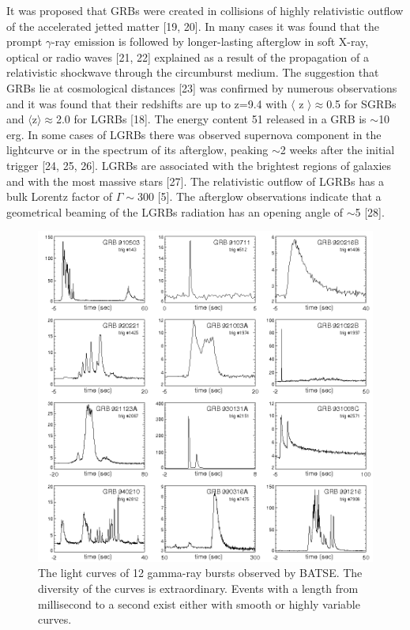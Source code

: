 \documentclass[12pt, a4paper,titlepage]{article}
\numberwithin{equation}{section}
\numberwithin{figure}{section}
\begin{document}
It was proposed that GRBs were created in collisions of highly relativistic outflow of the accelerated jetted matter [19, 20]. In many cases it was found that the prompt $\gamma$-ray emission is followed by longer-lasting afterglow in soft X-ray, optical or radio waves [21, 22] explained as a result of the propagation of a relativistic shockwave through the circumburst medium. The suggestion that GRBs lie at cosmological distances [23] was confirmed by numerous observations and it was found that their redshifts are up to z=9.4 with $\langle$ z $\rangle\approx$0.5 for SGRBs and $\langle$z$\rangle \approx$2.0 for LGRBs [18]. The energy content 51 released in a GRB is $\sim$10 erg.
In some cases of LGRBs there was observed supernova component in the lightcurve or in the spectrum of its afterglow, peaking $\sim$2 weeks after the initial trigger [24, 25, 26]. LGRBs are associated with the brightest regions of galaxies and with the most massive stars [27]. The relativistic outflow of LGRBs has a bulk Lorentz factor of $\Gamma\sim$300 [5]. The afterglow observations indicate that a geometrical beaming of the LGRBs radiation has an opening angle of $\sim$5 [28].

\begin{figure}[H]
\centering
\includegraphics[width=130.0mm]{images/GRB_BATSE_12lightcurves.png}
\caption{The light curves of 12 gamma-ray bursts observed by BATSE. The diversity of the curves is extraordinary. Events with a length from millisecond to a second exist either with smooth or highly variable curves.}
\end{figure}
\end{document}
